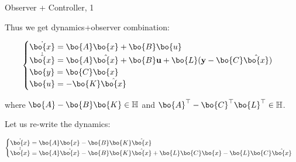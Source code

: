 \documentclass{beamer}
\begin{document}
\begin{frame}{Observer + Controller, 1}
\begin{flushleft}

Thus we get dynamics+observer combination:

\begin{equation}
\begin{cases}
\dot {\bo{x}} = \bo{A} \bo{x} + \bo{B} \bo{u} \\
\dot{\hat{\bo{x}}}  = \bo{A} \hat{\bo{x}} + \bo{B} \mathbf u + \bo{L}(\mathbf y - \bo{C} \hat{\bo{x}})\\
\bo{y} = \bo{C} \bo{x} \\
\bo{u} = -\bo{K} \hat{\bo{x}}
\end{cases}
\end{equation}

\bigskip

where $\bo{A} - \bo{B} \bo{K} \in \mathbb{H}$ and $\bo{A}^{\top} - 
\bo{C}^{\top} \bo{L}^{\top} \in \mathbb{H}$.

Let us re-write the dynamics:

\begin{equation}
	\begin{cases}
		\dot {\bo{x}} =\bo{A} \bo{x} - \bo{B} \bo{K} \hat{\bo{x}} 
		\\
		\dot{\hat{\bo{x}}}  = \bo{A} \hat{\bo{x}} - \bo{B} \bo{K}\hat{\bo{x}} +\bo{L}\bo{C} \bo{x} - \bo{L}\bo{C} \hat{\bo{x}}
	\end{cases}
\end{equation}


\end{flushleft}
\end{frame}
\end{document}
